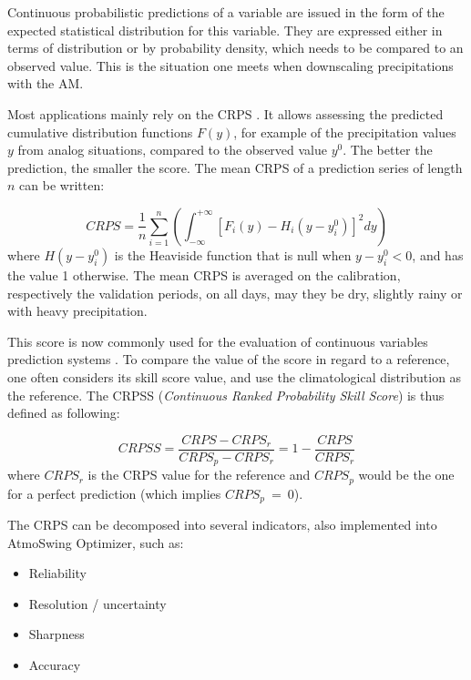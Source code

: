 \documentclass[review]{elsarticle}
\begin{document}
Continuous probabilistic predictions of a variable are issued in the form of the expected statistical distribution for this variable. They are expressed either in terms of distribution or by probability density, which needs to be compared to an observed value. This is the situation one meets when downscaling precipitations with the AM.

Most applications mainly rely on the CRPS \citep[Continuous Ranked Probability Score,][]{Brown1974, Matheson1976, Hersbach2000}. It allows assessing the predicted cumulative distribution functions $F(y)$, for example of the precipitation values $y$ from analog situations, compared to the observed value $y^{0}$. The better the prediction, the smaller the score. The mean CRPS of a prediction series of length $n$ can be written:

\begin{equation}
\label{eq:CRPS}
CRPS = \frac{1}{n} \sum_{i=1}^{n} \left(  \int_{-\infty}^{+\infty} \left[ F_{i}(y)-H_{i}(y-y_{i}^{0})\right]^{2} dy \right) 
\end{equation}
where $H(y-y_{i}^{0})$ is the Heaviside function that is null when $y-y_{i}^{0}<0$, and has the value 1 otherwise. The mean CRPS is averaged on the calibration, respectively the validation periods, on all days, may they be dry, slightly rainy or with heavy precipitation.

This score is now commonly used for the evaluation of continuous variables prediction systems \citep{Casati2008, Marty2010}. To compare the value of the score in regard to a reference, one often considers its skill score value, and use the climatological distribution as the reference. The CRPSS (\textit{Continuous Ranked Probability Skill Score}) is thus defined as following:

\begin{equation}
\label{eq:CRPSS}
CRPSS = \frac{CRPS-CRPS_{r}}{CRPS_{p}-CRPS_{r}} = 1-\frac{CRPS}{CRPS_{r}}
\end{equation}
where $CRPS_{r}$ is the CRPS value for the reference and $CRPS_{p}$ would be the one for a perfect prediction (which implies $CRPS_{p}~=~0$).

The CRPS can be decomposed into several indicators, also implemented into AtmoSwing Optimizer, such as:

\begin{itemize}
	\setlength\itemsep{-1mm}
	\item Reliability \citep{Hersbach2000}
	\item Resolution / uncertainty \citep{Hersbach2000}
	\item Sharpness \citep{Bontron2004}
	\item Accuracy \citep{Bontron2004}
\end{itemize}
\end{document}
